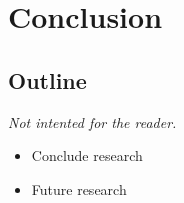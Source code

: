 
\chapter{Conclusion}

\label{Chapter7} %


\section{Outline}
\emph{Not intented for the reader.}
\begin{itemize}
  \item Conclude research
  \item Future research
\end{itemize}